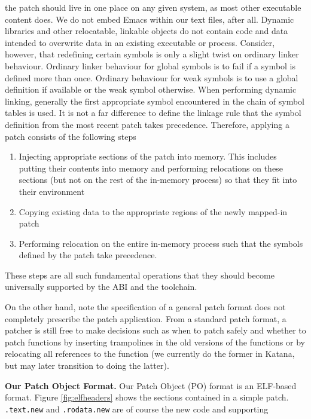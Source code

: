the patch should live in one place on any given system, as most other
executable content does. We do not embed Emacs within our text files,
after all. Dynamic libraries and other relocatable, linkable objects
do not contain code and data intended to overwrite data in an existing
executable or process. Consider, however, that redefining certain
symbols is only a slight twist on ordinary linker behaviour. Ordinary
linker behaviour for global symbols is to fail if a symbol is defined
more than once. Ordinary behaviour for weak symbols is to use a global
definition if available or the weak symbol otherwise. When performing
dynamic linking, generally the first appropriate symbol encountered in
the chain of symbol tables is used. It is not a far difference to
define the linkage rule that the symbol definition from the most
recent patch takes precedence. Therefore, applying a patch consists of
the following steps
\begin{enumerate}
\item Injecting appropriate sections of the patch into memory. This
includes putting their contents into memory and performing relocations
on these sections (but not on the rest of the in-memory process) so
that they fit into their environment
\item Copying existing data to the appropriate regions of the newly
mapped-in patch
\item Performing relocation on the entire in-memory process such that the
symbols defined by the patch take precedence.
\end{enumerate}
These steps are all such fundamental operations that they should
become universally supported by the ABI and the toolchain. 

On the other hand, note the specification of a general patch
format does not completely prescribe the patch application. From a
standard patch format, a patcher is still free to make decisions such
as when to patch safely and whether to patch functions by inserting
trampolines in the old versions of the functions or by relocating all
references to the function (we currently do the former in Katana, but
may later transition to doing the latter).

{\bf Our Patch Object Format.}
Our Patch Object (PO) format is an ELF-based format. Figure
\ref{fig:elfheaders} shows the sections contained in a simple
patch. \texttt{.text.new} and \texttt{.rodata.new} are of course the
new code and supporting

